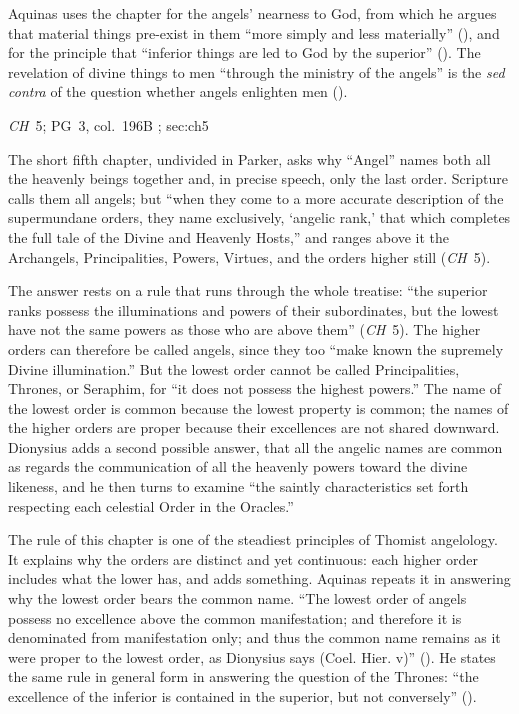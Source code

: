 Aquinas uses the chapter for the angels' nearness to God, from which he
argues that material things pre-exist in them ``more simply and less
materially'' (), and for the principle that
``inferior things are led to God by the superior'' (). The revelation of divine things to men ``through the ministry of
the angels'' is the \emph{sed contra} of the question whether angels
enlighten men ().

{\emph{CH}~5; PG~3, col.~196B}
{; }{sec:ch5}

The short fifth chapter, undivided in Parker, asks why ``Angel'' names
both all the heavenly beings together and, in precise speech, only the
last order. Scripture calls them all angels; but ``when they come to a
more accurate description of the supermundane orders, they name
exclusively, `angelic rank,' that which completes the full tale of the
Divine and Heavenly Hosts,'' and ranges above it the Archangels,
Principalities, Powers, Virtues, and the orders higher still (\emph{CH}~5).

The answer rests on a rule that runs through the whole treatise: ``the
superior ranks possess the illuminations and powers of their
subordinates, but the lowest have not the same powers as those who are
above them'' (\emph{CH}~5). The higher orders can therefore be called
angels, since they too ``make known the supremely Divine illumination.''
But the lowest order cannot be called Principalities, Thrones, or
Seraphim, for ``it does not possess the highest powers.'' The name of
the lowest order is common because the lowest property is common; the
names of the higher orders are proper because their excellences are not
shared downward. Dionysius adds a second possible answer, that all the
angelic names are common as regards the communication of all the
heavenly powers toward the divine likeness, and he then turns to examine
``the saintly characteristics set forth respecting each celestial Order
in the Oracles.''

The rule of this chapter is one of the steadiest principles of
Thomist angelology. It explains why the orders are distinct and yet
continuous: each higher order includes what the lower has, and adds
something. Aquinas repeats it in answering why the lowest order bears the
common name. ``The lowest order of angels possess no excellence above the
common manifestation; and therefore it is denominated from manifestation
only; and thus the common name remains as it were proper to the lowest
order, as Dionysius says (Coel. Hier. v)'' (). He
states the same rule in general form in answering the question of the
Thrones: ``the excellence of the inferior is contained in the superior,
but not conversely'' ().

